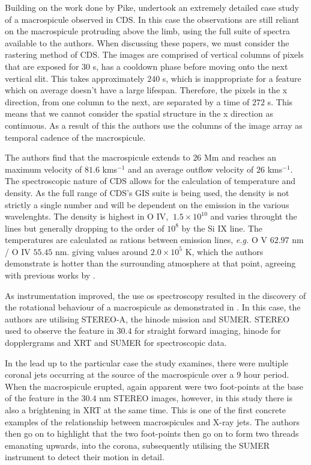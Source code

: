 Building on the work done by Pike, \cite{Parenti2002} undertook an extremely detailed case study of a macrospicule observed in CDS.
In this case the observations are still reliant on the macrospicule protruding above the limb, using the full suite of spectra available to the authors.
When discussing these papers, we must consider the rastering method of CDS.
The images are comprised of vertical columns of pixels that are exposed for $30 $ s, has a cooldown phase before moving onto the next vertical slit. 
This takes approximately $240$ s, which is inappropriate for a feature which on average doesn't have a large lifespan.
Therefore, the pixels in the x direction, from one column to the next, are separated by a time of $272$ s.
This means that we cannot consider the spatial structure in the x direction as continuous.
As a result of this the authors use the columns of the image array as temporal cadence of the macrospicule. 

The authors find that the macrospicule extends to $26$ Mm and reaches an maximum velocity of $81.6$ kms${^{-1}}$ and an average outflow velocity of $26$ kms${^{-1}}$.
The spectroscopic nature of CDS allows for the calculation of temperature and density.
As the full range of CDS's GIS suite is being used, the density is not strictly a single number and will be dependent on the emission in the various wavelenghts.
The density is highest in O IV, $~1.5 \times 10^10$ and varies throught the lines but generally dropping to the order of $10^8$ by the Si IX line.
The temperatures are calculated as rations between emission lines, \emph{e.g.} O V $62.97$ nm / O IV $55.45$ nm. giving values around $2.0 \times 10^5$ K, which the authors demonstrate is hotter than the surrounding atmosphere at that point, agreeing with previous works by \cite{Habbal1991}.



As instrumentation improved, the use os spectroscopy resulted in the discovery of the rotational behaviour of a macrospicule as demonstrated in \cite{Kamio2010}.
In this case, the authors are utilising STEREO-A, the hinode mission and SUMER. 
STEREO used to observe the feature in $30.4$ for straight forward imaging, hinode for dopplergrams and XRT and SUMER for spectroscopic data.

In the lead up to the particular case the study examines, there were multiple coronal jets occurring at the source of the macrospicule over a $9$ hour period.
When the macrospicule erupted, again apparent were two foot-points at the base of the feature in the $30.4$ nm STEREO images, however, in this study there is also a brightening in XRT at the same time. 
This is one of the first concrete examples of the relationship between macrospicules and X-ray jets.
The authors then go on to highlight that the two foot-points then go on to form two threads emanating upwards, into the corona, subsequently utilising the SUMER instrument to detect their motion in detail.

